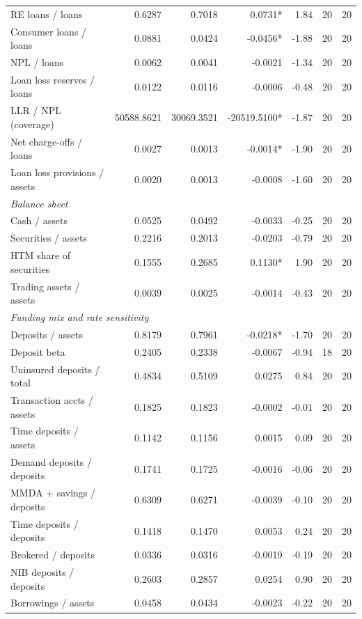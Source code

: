 \begin{tabular}{lrrrrrr}
RE loans / loans & 0.6287 & 0.7018 & 0.0731* & 1.84 & 20 & 20 \\
Consumer loans / loans & 0.0881 & 0.0424 & -0.0456* & -1.88 & 20 & 20 \\
NPL / loans & 0.0062 & 0.0041 & -0.0021 & -1.34 & 20 & 20 \\
Loan loss reserves / loans & 0.0122 & 0.0116 & -0.0006 & -0.48 & 20 & 20 \\
LLR / NPL (coverage) & 50588.8621 & 30069.3521 & -20519.5100* & -1.87 & 20 & 20 \\
Net charge-offs / loans & 0.0027 & 0.0013 & -0.0014* & -1.90 & 20 & 20 \\
Loan loss provisions / assets & 0.0020 & 0.0013 & -0.0008 & -1.60 & 20 & 20 \\
\midrule
\multicolumn{7}{l}{\emph{Balance sheet}} \\
\midrule
Cash / assets & 0.0525 & 0.0492 & -0.0033 & -0.25 & 20 & 20 \\
Securities / assets & 0.2216 & 0.2013 & -0.0203 & -0.79 & 20 & 20 \\
HTM share of securities & 0.1555 & 0.2685 & 0.1130* & 1.90 & 20 & 20 \\
Trading assets / assets & 0.0039 & 0.0025 & -0.0014 & -0.43 & 20 & 20 \\
\midrule
\multicolumn{7}{l}{\emph{Funding mix and rate sensitivity}} \\
\midrule
Deposits / assets & 0.8179 & 0.7961 & -0.0218* & -1.70 & 20 & 20 \\
Deposit beta & 0.2405 & 0.2338 & -0.0067 & -0.94 & 18 & 20 \\
Uninsured deposits / total & 0.4834 & 0.5109 & 0.0275 & 0.84 & 20 & 20 \\
Transaction accts / assets & 0.1825 & 0.1823 & -0.0002 & -0.01 & 20 & 20 \\
Time deposits / assets & 0.1142 & 0.1156 & 0.0015 & 0.09 & 20 & 20 \\
Demand deposits / deposits & 0.1741 & 0.1725 & -0.0016 & -0.06 & 20 & 20 \\
MMDA + savings / deposits & 0.6309 & 0.6271 & -0.0039 & -0.10 & 20 & 20 \\
Time deposits / deposits & 0.1418 & 0.1470 & 0.0053 & 0.24 & 20 & 20 \\
Brokered / deposits & 0.0336 & 0.0316 & -0.0019 & -0.19 & 20 & 20 \\
NIB deposits / deposits & 0.2603 & 0.2857 & 0.0254 & 0.90 & 20 & 20 \\
Borrowings / assets & 0.0458 & 0.0434 & -0.0023 & -0.22 & 20 & 20 \\

\end{tabular}
